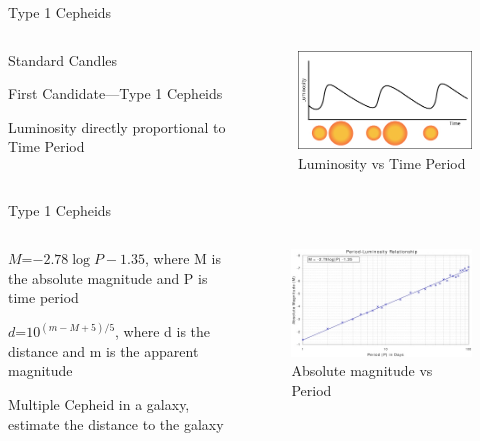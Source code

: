 \documentclass[aspectratio=169]{beamer}                    %
\begin{document}
\begin{frame}{Type 1 Cepheids}
\graphicspath{ {./Images/} }
    \begin{columns}
        
    \begin{vfilleditems}
        \item Standard Candles
        \item First Candidate---Type 1 Cepheids
        \item Luminosity directly proportional to Time Period
    \end{vfilleditems}
    \begin{figure}
       \centering
       \includegraphics[width=6cm]{cepheid-variable time curve}
       \caption{Luminosity vs Time Period}
       \label{fig:my_label}
    \end{figure}
    \end{columns}
\end{frame}

\begin{frame}{Type 1 Cepheids}
\graphicspath{ {./Images/} }
    \begin{columns}
    
    \begin{vfilleditems}
        \item $M $=$ -2.78\log P-1.35$, where M is the absolute magnitude and P is time period
        \item $d$=$ 10^{(m-M+5)/5}$, where d is the distance and m is the apparent magnitude
        \item Multiple Cepheid in a galaxy, estimate the distance to the galaxy
    \end{vfilleditems}
    \begin{figure}
        \centering
        \includegraphics[scale=4]{Cepheid magnitude}
        \caption{Absolute magnitude vs Period}
        \label{fig:my_label}
    \end{figure}
    \end{columns}
\end{frame}
\end{document}
